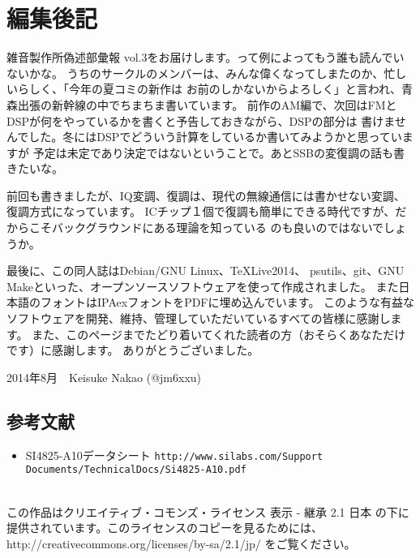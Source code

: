 \section*{編集後記}
雑音製作所偽述部彙報 vol.3をお届けします。って例によってもう誰も読んでいないかな。
うちのサークルのメンバーは、みんな偉くなってしまたのか、忙しいらしく、「今年の夏コミの新作は
お前のしかないからよろしく」と言われ、青森出張の新幹線の中でちまちま書いています。
前作のAM編で、次回はFMとDSPが何をやっているかを書くと予告しておきながら、DSPの部分は
書けませんでした。冬にはDSPでどういう計算をしているか書いてみようかと思っていますが
予定は未定であり決定ではないということで。あとSSBの変復調の話も書きたいな。

前回も書きましたが、IQ変調、復調は、現代の無線通信には書かせない変調、復調方式になっています。
ICチップ１個で復調も簡単にできる時代ですが、だからこそバックグラウンドにある理論を知っている
のも良いのではないでしょうか。

最後に、この同人誌はDebian/GNU Linux、\TeX Live2014、
psutils、git、GNU Makeといった、オープンソースソフトウェアを使って作成されました。
また日本語のフォントはIPAexフォントをPDFに埋め込んでいます。
このような有益なソフトウェアを開発、維持、管理していただいているすべての皆様に感謝します。
また、このページまでたどり着いてくれた読者の方（おそらくあなただけです）に感謝します。
ありがとうございました。

\begin{flushright}
2014年8月　Keisuke Nakao (@jm6xxu) 
\end{flushright}

\subsection*{参考文献}
\begin{itemize}
  \item 
    SI4825-A10データシート \texttt{http://www.silabs.com/Support Documents/TechnicalDocs/Si4825-A10.pdf}
   \end{itemize}
\clearpage
\mbox{}
\vspace{36em}\\
この作品はクリエイティブ・コモンズ・ライセンス 表示 - 継承 2.1 日本 の下に提供されています。このライセンスのコピーを見るためには、http://creativecommons.org/licenses/by-sa/2.1/jp/ をご覧ください。
